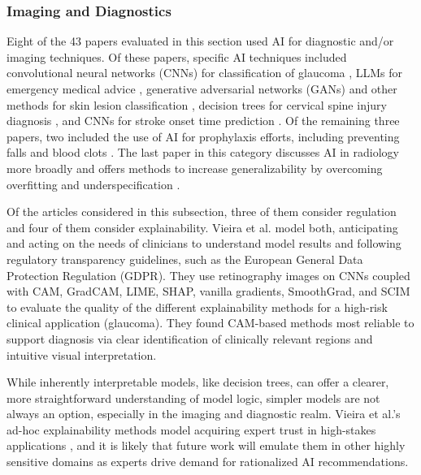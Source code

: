 \documentclass[preprint,12pt]{elsarticle}
\begin{document}
\subsubsection{Imaging and Diagnostics}
Eight of the 43 papers evaluated in this section used AI for diagnostic and/or
imaging techniques. Of these papers, specific AI techniques included
convolutional neural networks (CNNs) for classification of glaucoma
\cite{vieiraExploringTransparencyComparative2025}, LLMs for emergency medical
advice \cite{yauAccuracyProspectiveAssessments2024}, generative adversarial
networks (GANs) and other methods for skin lesion classification
\cite{mettaAdvancingDermatologicalDiagnostics2024}, decision trees for cervical
spine injury diagnosis \cite{bertsimasPredictionCervicalSpine2019}, and CNNs for
stroke onset time prediction \cite{akayDeepLearningAnalysis2023}. Of the
remaining three papers, two included the use of AI for prophylaxis efforts,
including preventing falls \cite{wooEvaluationMLbasedClinical2020} and blood
clots \cite{zhouRetrospectiveStudyEffectiveness2021}. The last paper in this
category discusses AI in radiology more broadly and offers methods to increase
generalizability by overcoming overfitting and underspecification
\cite{echeGeneralizabilityDeploymentArtificial2021}. 

Of the articles considered in this subsection, three of them consider regulation
and four of them consider explainability. Vieira et al.
\cite{vieiraExploringTransparencyComparative2025} model both, anticipating and
acting on the needs of clinicians to understand model results and following
regulatory transparency guidelines, such as the European General Data Protection
Regulation (GDPR). They use retinography images on CNNs coupled with CAM,
GradCAM, LIME, SHAP, vanilla gradients, SmoothGrad, and SCIM to evaluate the
quality of the different explainability methods for a high-risk clinical
application (glaucoma). They found CAM-based methods most reliable to support
diagnosis via clear identification of clinically relevant regions and intuitive
visual interpretation.

While inherently interpretable models, like decision trees, can offer a clearer,
more straightforward understanding of model logic, simpler models are not always
an option, especially in the imaging and diagnostic realm. Vieira et al.'s
ad-hoc explainability methods model acquiring expert trust in high-stakes
applications \cite{vieiraExploringTransparencyComparative2025}, and it is likely
that future work will emulate them in other highly sensitive domains as experts
drive demand for rationalized AI recommendations.
\end{document}
